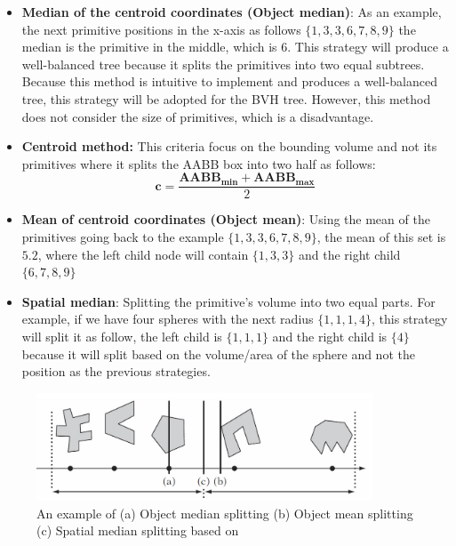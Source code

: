 \documentclass[11pt,a4paper]{article}
\begin{document}
\begin{itemize}
\item \textbf{Median of the centroid coordinates (Object median)}: As an example, the next primitive positions in the x-axis as follows $\{1, 3, 3, 6, 7, 8, 9\}$ the median is the primitive in the middle, which is $6$. This strategy will produce a well-balanced tree because it splits the primitives into two equal subtrees. Because this method is intuitive to implement and produces a well-balanced tree, this strategy will be adopted for the BVH tree. However, this method does not consider the size of primitives, which is a disadvantage.

\item \textbf{Centroid method:}
This criteria focus on the bounding volume and not its primitives where it splits the AABB box into two half as follows:
\begin{equation}
\boldsymbol{c} = \frac{\boldsymbol{{AABB_{min}}}+\boldsymbol{{AABB_{max}}}}{2}
\end{equation}

\item  \textbf{Mean of centroid coordinates (Object mean)}: Using the mean of the primitives going back to the example $\{1, 3, 3, 6, 7, 8, 9\}$, the mean of this set is $5.2$, where the left child node will contain $\{1,3,3\}$ and the right child $\{6,7,8,9\}$

\item  \textbf{Spatial median}: Splitting the primitive's volume into two equal parts. For example, if we have four spheres with the next radius $\{1,1,1,4\}$, this strategy will split it as follow, the left child is $\{1,1,1\}$ and the right child is $\{4\}$ because it will split based on the volume/area of the sphere and not the position as the previous strategies. 


\end{itemize}


\begin{figure}[H]	
     \centering
     \captionsetup{justification=centering,margin=2cm}
     \includegraphics[width=10cm]{images/bvh_split.png}
     \caption{An example of (a) Object median splitting (b) Object mean splitting (c) Spatial median
splitting based on \protect\cite{Ericson2004}}
        \label{fig:dice}
\end{figure}
\end{document}
